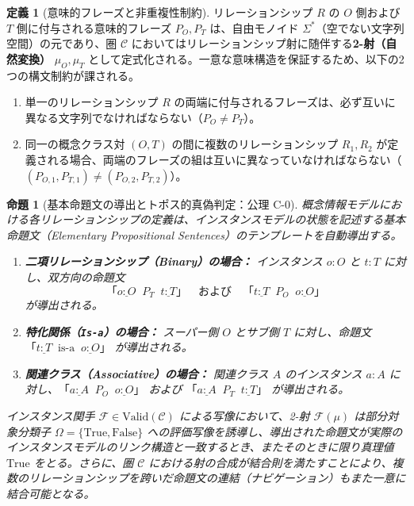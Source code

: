 \documentclass[11pt,a4paper]{ltjsarticle}
\theoremstyle{definition}
\newtheorem{definition}{定義}[section]
\theoremstyle{plain}
\newtheorem{proposition}{命題}[section]
\theoremstyle{remark}
\newcommand{\Valid}{\mathrm{Valid}}
\begin{document}
\begin{definition}[意味的フレーズと非重複性制約]\label{def:phrases}
リレーションシップ $R$ の $O$ 側および $T$ 側に付与される意味的フレーズ $P_O, P_T$ は、自由モノイド $\Sigma^*$（空でない文字列空間）の元であり、圏 $\mathcal{C}$ においてはリレーションシップ射に随伴する\textbf{2-射（自然変換）} $\mu_O, \mu_T$ として定式化される。一意な意味構造を保証するため、以下の2つの構文制約が課される。
\begin{enumerate}
    \item 単一のリレーションシップ $R$ の両端に付与されるフレーズは、必ず互いに異なる文字列でなければならない（$P_O \neq P_T$）。
    \item 同一の概念クラス対 $(O, T)$ の間に複数のリレーションシップ $R_1, R_2$ が定義される場合、両端のフレーズの組は互いに異なっていなければならない（$(P_{O,1}, P_{T,1}) \neq (P_{O,2}, P_{T,2})$）。
\end{enumerate}
\end{definition}

\begin{proposition}[基本命題文の導出とトポス的真偽判定：公理 C-0]\label{prop:propositions}
概念情報モデルにおける各リレーションシップの定義は、インスタンスモデルの状態を記述する基本命題文（Elementary Propositional Sentences）のテンプレートを自動導出する。
\begin{enumerate}
    \item \textbf{二項リレーションシップ（Binary）の場合：} インスタンス $o:O$ と $t:T$ に対し、双方向の命題文
    \begin{equation}
    \text{「}\underline{o:O}\;\; P_T \;\;\underline{t:T}\text{」} \quad \text{および} \quad \text{「}\underline{t:T}\;\; P_O \;\;\underline{o:O}\text{」}
    \end{equation}
    が導出される。
    \item \textbf{特化関係（\texttt{Is-a}）の場合：} スーパー側 $O$ とサブ側 $T$ に対し、命題文 $\text{「}\underline{t:T}\;\; \text{is-a} \;\;\underline{o:O}\text{」}$ が導出される。
    \item \textbf{関連クラス（Associative）の場合：} 関連クラス $A$ のインスタンス $a:A$ に対し、$\text{「}\underline{a:A}\;\; P_O \;\;\underline{o:O}\text{」}$ および $\text{「}\underline{a:A}\;\; P_T \;\;\underline{t:T}\text{」}$ が導出される。
\end{enumerate}
インスタンス関手 $\mathcal{F} \in \Valid(\mathcal{C})$ による写像において、2-射 $\mathcal{F}(\mu)$ は部分対象分類子 $\Omega = \{\mathrm{True}, \mathrm{False}\}$ \cite{maclane1992} への評価写像を誘導し、導出された命題文が実際のインスタンスモデルのリンク構造と一致するとき、またそのときに限り真理値 $\mathrm{True}$ をとる。さらに、圏 $\mathcal{C}$ における射の合成が結合則を満たすことにより、複数のリレーションシップを跨いだ命題文の連結（ナビゲーション）もまた一意に結合可能となる。
\end{proposition}
\end{document}

